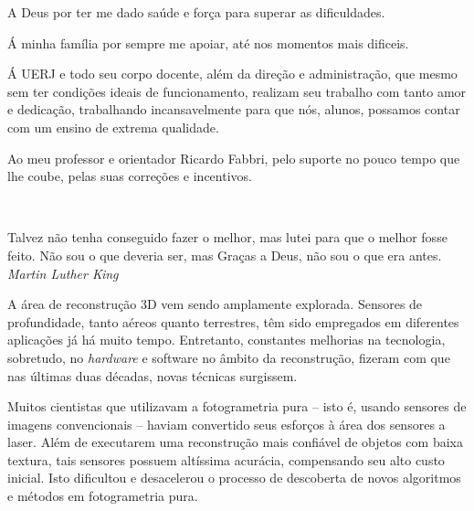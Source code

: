 \documentclass[a4paper,12pt,oneside,onecolumn,final,fleqn]{repUERJ}
\theoremstyle{plain}
\theoremstyle{definition}
\begin{document}




A Deus por ter me dado saúde e força para superar as dificuldades.


Á minha família por sempre me apoiar, até nos momentos mais dificeis.


Á UERJ e todo seu corpo docente, além da direção e administração, que mesmo sem ter condições ideais de funcionamento, realizam seu trabalho com tanto amor e dedicação, trabalhando incansavelmente para que nós, alunos, possamos contar com um ensino de extrema qualidade.


Ao meu professor e orientador Ricardo Fabbri, pelo suporte no pouco tempo que lhe coube, pelas suas correções e incentivos.


\pretextualchapter{}

  \vfill\
  \begin{flushright}
 Talvez não tenha conseguido fazer o melhor, mas lutei para que o melhor fosse feito. Não sou o que deveria ser, mas Graças a Deus, não sou o que era antes. \\
    \textsl{Martin Luther King}
  \end{flushright}




A área de reconstrução 3D vem sendo amplamente explorada. Sensores de
profundidade, tanto aéreos quanto terrestres, têm sido empregados em diferentes
aplicações já há muito tempo. Entretanto, constantes melhorias na tecnologia, sobretudo, no
\emph{hardware} e software no âmbito da reconstrução, fizeram com que
nas últimas duas décadas, novas técnicas surgissem.

Muitos cientistas que utilizavam a fotogrametria pura -- isto é, usando sensores de 
imagens convencionais -- haviam convertido seus esforços à área dos sensores a laser. Além de
executarem uma reconstrução mais confiável de objetos com baixa
textura, tais sensores possuem altíssima acurácia, compensando seu alto
custo inicial.  Isto dificultou e desacelerou o processo de descoberta de novos
algoritmos e métodos em fotogrametria pura.
\end{document}
